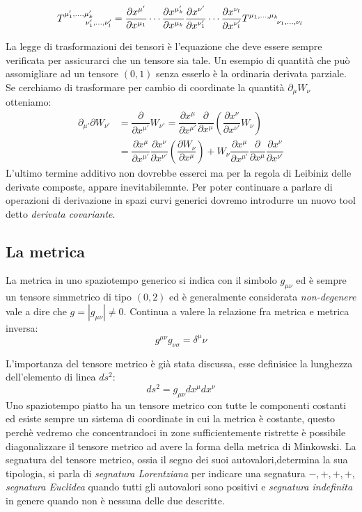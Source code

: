 \documentclass[twoside]{article}
\begin{document}
\begin{equation}
 T^{\mu'_1,\ldots,\mu'_k}_{\ \qquad\nu'_1,\ldots,\nu'_l} 
= \dfrac{\partial x^{\mu'}}{\partial x^{\mu_1}} \cdots \dfrac{\partial x^{\mu'_k}}{\partial x^{\mu_k}}
\dfrac{\partial x^{\nu'}}{\partial x^{\nu'_1}} \cdots \dfrac{\partial x^{\nu_l}}{\partial x^{\nu'_l}}
T\indices{^{\mu_1,\ldots,\mu_k}_{\nu_1,\ldots,\nu_l}}
 \end{equation}

La legge di trasformazioni dei tensori è l'equazione che deve essere sempre verificata per assicurarci che un tensore sia tale. Un esempio di quantità che può assomigliare ad un tensore $(0,1)$ senza esserlo è la ordinaria derivata parziale. Se cerchiamo di trasformare per cambio di coordinate la quantità $\partial_\mu W_\nu$ otteniamo:
\begin{align*}
	\partial_{\mu'}\partial W_{\nu'} & = \dfrac{\partial}{\partial x^{\mu'}}W_{\nu'} = 
	\dfrac{\partial x^\mu}{\partial x^{\mu'}} 
	\dfrac{\partial}{\partial x^{\mu}}
	\left ( \dfrac{\partial x^\nu}{\partial x^{\nu'}} W_{\nu} \right ) \\
	& = \dfrac{\partial x^\mu}{\partial x^{\mu'} } \dfrac{\partial x^\nu}{\partial x^{\nu'}} 
	\left( \dfrac{\partial W_\nu}{\partial x^{\mu} }\right ) 
	+ W_\nu \dfrac{\partial x^{\mu} }{ \partial x^{\mu'} }\dfrac{\partial}{\partial x^\mu}
	\dfrac{\partial x^{\nu}}{\partial x^{\nu'}}
\end{align*}
L'ultimo termine additivo non dovrebbe esserci ma per la regola di Leibiniz delle derivate composte, appare inevitabilemnte. Per poter continuare a parlare di operazioni di derivazione in spazi curvi generici dovremo introdurre un nuovo tool detto \emph{derivata covariante}.
\subsection{La metrica}
La metrica in uno spaziotempo generico si indica con il simbolo $g_{\mu \nu}$ ed è sempre un tensore simmetrico di tipo $(0,2)$ ed è generalmente considerata \emph{non-degenere} vale a dire che $g = |g_{\mu \nu}| \neq 0$. Continua a valere la relazione fra metrica e metrica inversa:
$$
g^{\mu\nu}g_{\nu \sigma} = \delta^{\mu}\nu
$$

L'importanza del tensore metrico è già stata discussa, esse definisice la lunghezza dell'elemento di linea $ds^2$:
\begin{equation}
	ds^2 = g_{\mu \nu}dx^\mu dx^\nu
\end{equation}
Uno spaziotempo piatto ha un tensore metrico con tutte le componenti costanti ed esiste sempre un sistema di coordinate in cui la metrica è costante, questo perchè vedremo che concentrandoci in zone sufficientemente ristrette è possibile diagonalizzare il tensore metrico ad avere la forma della metrica di Minkowski.
La segnatura del tensore metrico, ossia il segno dei suoi autovalori,determina la sua tipologia, si parla di \emph{segnatura Lorentziana} per indicare una segnatura $-,+,+,+$, \emph{segnatura Euclidea} quando tutti gli autovalori sono positivi e \emph{segnatura indefinita} in genere quando non è nessuna delle due descritte.
\end{document}
